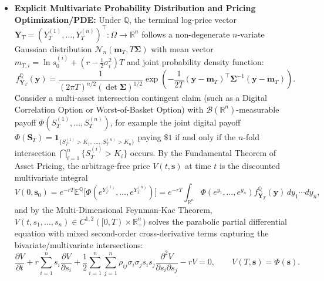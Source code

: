 \documentclass[11pt, letterpaper]{article}
\theoremstyle{definition}
\theoremstyle{remark}
\newcommand{\R}{\mathbb{R}}
\newcommand{\E}{\mathbb{E}}
\newcommand{\Prob}{\mathbb{P}}
\begin{document}
\begin{itemize}
\[    \]
    defines an equivalent martingale measure $\mathbb{Q} \sim \Prob$ under which $\widetilde{\mathbf{W}}_t^{\mathbb{Q}}$ has $d\widetilde{W}_t^{\mathbb{Q},(i)}\, d\widetilde{W}_t^{\mathbb{Q},(j)} = \rho_{ij}\, dt$ and the discounted asset prices $e^{-rt}S_t^{(i)}$ are $\mathbb{Q}$-martingales. Applying the Multi-Dimensional It\^{o}'s Lemma to $Y_t^{(i)} = \ln S_t^{(i)}$ yields the exact terminal multivariate log-return random vector at maturity $T$:
    \[
    Y_T^{(i)} = \ln S_T^{(i)} = \ln s_0^{(i)} + \left(r - \frac{1}{2}\sigma_i^2\right)T + \sigma_i \widetilde{W}_T^{\mathbb{Q},(i)}, \qquad i = 1, \dots, n.
    \]
    \item \textbf{Explicit Multivariate Probability Distribution and Pricing Optimization/PDE:} Under $\mathbb{Q}$, the terminal log-price vector $\mathbf{Y}_T = (Y_T^{(1)}, \dots, Y_T^{(n)})^\top : \Omega \to \R^n$ follows a non-degenerate $n$-variate Gaussian distribution $\mathcal{N}_n(\mathbf{m}_T, T\boldsymbol{\Sigma})$ with mean vector $m_{T,i} = \ln s_0^{(i)} + (r - \frac{1}{2}\sigma_i^2)T$ and joint probability density function:
    \[
    f_{\mathbf{Y}_T}^{\mathbb{Q}}(\mathbf{y}) = \frac{1}{(2\pi T)^{n/2} (\det \boldsymbol{\Sigma})^{1/2}} \exp\left(-\frac{1}{2T}(\mathbf{y} - \mathbf{m}_T)^\top \boldsymbol{\Sigma}^{-1} (\mathbf{y} - \mathbf{m}_T)\right).
    \]
    Consider a multi-asset intersection contingent claim (such as a Digital Correlation Option or Worst-of-Basket Option) with $\mathcal{B}(\R^n)$-measurable payoff $\Phi(S_T^{(1)}, \dots, S_T^{(n)})$, for example the joint digital payoff $\Phi(\mathbf{S}_T) = \mathbf{1}_{\{S_T^{(1)} > K_1,\ \dots,\ S_T^{(n)} > K_n\}}$ paying $\$1$ if and only if the $n$-fold intersection $\bigcap_{i=1}^n \{S_T^{(i)} > K_i\}$ occurs. By the Fundamental Theorem of Asset Pricing, the arbitrage-free price $V(t, \mathbf{s})$ at time $t$ is the discounted multivariate integral
    \[
    V(0, \mathbf{s}_0) = e^{-rT} \E^{\mathbb{Q}}\bigl[\Phi(e^{Y_T^{(1)}}, \dots, e^{Y_T^{(n)}})\bigr] = e^{-rT} \int_{\R^n} \Phi(e^{y_1}, \dots, e^{y_n}) f_{\mathbf{Y}_T}^{\mathbb{Q}}(\mathbf{y})\, dy_1 \cdots dy_n,
    \]
    and by the Multi-Dimensional Feynman-Kac Theorem, $V(t, s_1, \dots, s_n) \in C^{1,2}([0, T) \times \R_+^n)$ solves the parabolic partial differential equation with mixed second-order cross-derivative terms capturing the bivariate/multivariate intersections:
    \[
    \frac{\partial V}{\partial t} + r \sum_{i=1}^{n} s_i \frac{\partial V}{\partial s_i} + \frac{1}{2} \sum_{i=1}^{n} \sum_{j=1}^{n} \rho_{ij} \sigma_i \sigma_j s_i s_j \frac{\partial^2 V}{\partial s_i \partial s_j} - rV = 0, \qquad V(T, \mathbf{s}) = \Phi(\mathbf{s}).
    \]
\end{itemize}
\end{document}
